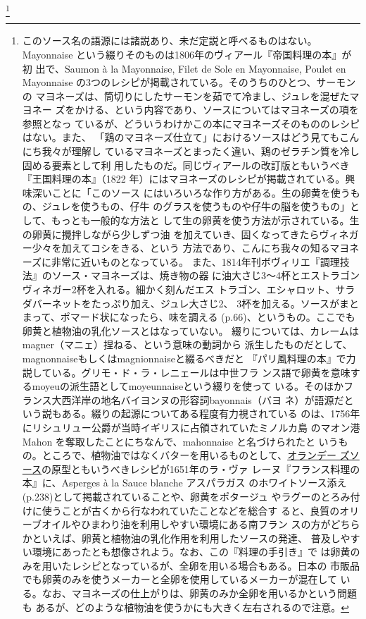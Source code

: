 \begin{recette}
\footnote{このソース名の語源には諸説あり、未だ定説と呼べるものはない。
  Mayonnaise という綴りそのものは1806年のヴィアール『帝国料理の本』が初
  出で、Saumon à la Mayonnaise, Filet de Sole en Mayonnaise, Poulet en
  Mayonnaise の3つのレシピが掲載されている。そのうちのひとつ、サーモンの
  マヨネーズは、筒切りにしたサーモンを茹でて冷まし、ジュレを混ぜたマヨネー
  ズをかける、という内容であり、ソースについてはマヨネーズの項を参照となっ
  ているが、どういうわけかこの本にマヨネーズそのもののレシピはない。また、
  「鶏のマヨネーズ仕立て」におけるソースはどう見てもこんにち我々が理解し
  ているマヨネーズとまったく違い、鶏のゼラチン質を冷し固める要素として利
  用したものだ。同じヴィアールの改訂版ともいうべき『王国料理の本』（1822
  年）にはマヨネーズのレシピが掲載されている。興味深いことに「このソース
  にはいろいろな作り方がある。生の卵黄を使うもの、ジュレを使うもの、仔牛
  のグラスを使うものや仔牛の脳を使うもの」として、もっとも一般的な方法と
  して生の卵黄を使う方法が示されている。生の卵黄に攪拌しながら少しずつ油
  を加えていき、固くなってきたらヴィネガー少々を加えてコシをきる、という
  方法であり、こんにち我々の知るマヨネーズに非常に近いものとなっている。
  また、1814年刊ボヴィリエ『調理技法』のソース・マヨネーズは、焼き物の器
  に油大さじ3〜4杯とエストラゴンヴィネガー2杯を入れる。細かく刻んだエス
  トラゴン、エシャロット、サラダバーネットをたっぷり加え、ジュレ大さじ2、
  3杯を加える。ソースがまとまって、ポマード状になったら、味を調える
  (p.66)、というもの。ここでも卵黄と植物油の乳化ソースとはなっていない。
  綴りについては、カレームはmagner（マニェ）捏ねる、という意味の動詞から
  派生したものだとして、magnonnaiseもしくはmagnionnaiseと綴るべきだと
  『パリ風料理の本』で力説している。グリモ・ド・ラ・レニェールは中世フラ
  ンス語で卵黄を意味するmoyeuの派生語としてmoyeunnaiseという綴りを使って
  いる。そのほかフランス大西洋岸の地名バイヨンヌの形容詞bayonnais（バヨ
  ネ）が語源だという説もある。綴りの起源についてある程度有力視されている
  のは、1756年にリシュリュー公爵が当時イギリスに占領されていたミノルカ島
  のマオン港 Mahon を奪取したことにちなんで、mahonnaise と名づけられたと
  いうもの。ところで、植物油ではなくバターを用いるものとして、\protect\hyperlink{sauce-hollandaise}{オランデー
  ズソース}の原型ともいうべきレシピが1651年のラ・ヴァ
  レーヌ『フランス料理の本』に、Asperges à la Sauce blanche アスパラガス
  のホワイトソース添え(p.238)として掲載されていることや、卵黄をポタージュ
  やラグーのとろみ付けに使うことが古くから行なわれていたことなどを総合す
  ると、良質のオリーブオイルやひまわり油を利用しやすい環境にある南フラン
  スの方がどちらかといえば、卵黄と植物油の乳化作用を利用したソースの発達、
  普及しやすい環境にあったとも想像されよう。なお、この『料理の手引き』で
  は卵黄のみを用いたレシピとなっているが、全卵を用いる場合もある。日本の
  市販品でも卵黄のみを使うメーカーと全卵を使用しているメーカーが混在して
  いる。なお、マヨネーズの仕上がりは、卵黄のみか全卵を用いるかという問題も
  あるが、どのような植物油を使うかにも大きく左右されるので注意。}


\end{recette}
